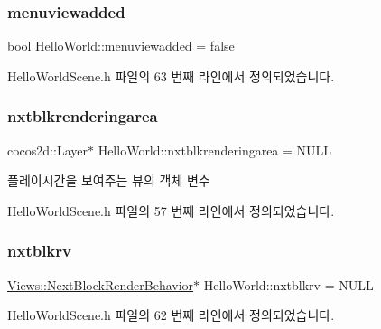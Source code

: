 \subsubsection{\texorpdfstring{menuviewadded}{menuviewadded}}
{\footnotesize\ttfamily bool Hello\+World\+::menuviewadded = false\hspace{0.3cm}{\ttfamily [protected]}}



Hello\+World\+Scene.\+h 파일의 63 번째 라인에서 정의되었습니다.

\mbox{\label{class_hello_world_a6ebd3cb915150357bd357df1ff4da932}} 
\subsubsection{\texorpdfstring{nxtblkrenderingarea}{nxtblkrenderingarea}}
{\footnotesize\ttfamily cocos2d\+::\+Layer$\ast$ Hello\+World\+::nxtblkrenderingarea = N\+U\+LL\hspace{0.3cm}{\ttfamily [protected]}}



플레이시간을 보여주는 뷰의 객체 변수 



Hello\+World\+Scene.\+h 파일의 57 번째 라인에서 정의되었습니다.

\mbox{\label{class_hello_world_ac06ca16fc5a18d32c58e0229c24817f6}} 
\subsubsection{\texorpdfstring{nxtblkrv}{nxtblkrv}}
{\footnotesize\ttfamily \hyperlink{class_tetris_1_1_views_1_1_next_block_render_behavior}{Views\+::\+Next\+Block\+Render\+Behavior}$\ast$ Hello\+World\+::nxtblkrv = N\+U\+LL\hspace{0.3cm}{\ttfamily [protected]}}



Hello\+World\+Scene.\+h 파일의 62 번째 라인에서 정의되었습니다.

\mbox{\label{class_hello_world_acc967707dff45c20f68321f07c86a21b}} 
